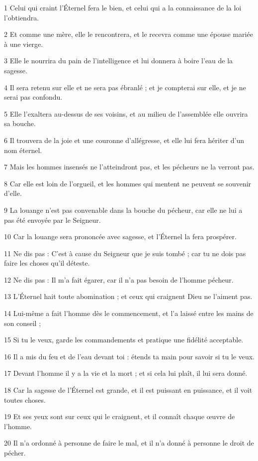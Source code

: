 \par 1 Celui qui craint l'Éternel fera le bien, et celui qui a la connaissance de la loi l'obtiendra.
\par 2 Et comme une mère, elle le rencontrera, et le recevra comme une épouse mariée à une vierge.
\par 3 Elle le nourrira du pain de l'intelligence et lui donnera à boire l'eau de la sagesse.
\par 4 Il sera retenu sur elle et ne sera pas ébranlé ; et je compterai sur elle, et je ne serai pas confondu.
\par 5 Elle l'exaltera au-dessus de ses voisins, et au milieu de l'assemblée elle ouvrira sa bouche.
\par 6 Il trouvera de la joie et une couronne d'allégresse, et elle lui fera hériter d'un nom éternel.
\par 7 Mais les hommes insensés ne l'atteindront pas, et les pécheurs ne la verront pas.
\par 8 Car elle est loin de l'orgueil, et les hommes qui mentent ne peuvent se souvenir d'elle.
\par 9 La louange n'est pas convenable dans la bouche du pécheur, car elle ne lui a pas été envoyée par le Seigneur.
\par 10 Car la louange sera prononcée avec sagesse, et l'Éternel la fera prospérer.
\par 11 Ne dis pas : C'est à cause du Seigneur que je suis tombé ; car tu ne dois pas faire les choses qu'il déteste.
\par 12 Ne dis pas : Il m'a fait égarer, car il n'a pas besoin de l'homme pécheur.
\par 13 L'Éternel hait toute abomination ; et ceux qui craignent Dieu ne l'aiment pas.
\par 14 Lui-même a fait l'homme dès le commencement, et l'a laissé entre les mains de son conseil ;
\par 15 Si tu le veux, garde les commandements et pratique une fidélité acceptable.
\par 16 Il a mis du feu et de l'eau devant toi : étends ta main pour savoir si tu le veux.
\par 17 Devant l'homme il y a la vie et la mort ; et si cela lui plaît, il lui sera donné.
\par 18 Car la sagesse de l'Éternel est grande, et il est puissant en puissance, et il voit toutes choses.
\par 19 Et ses yeux sont sur ceux qui le craignent, et il connaît chaque œuvre de l'homme.
\par 20 Il n'a ordonné à personne de faire le mal, et il n'a donné à personne le droit de pécher.

